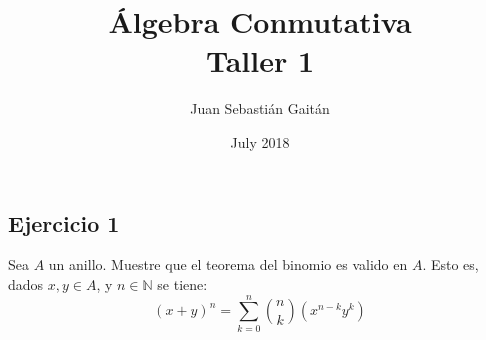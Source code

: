 \documentclass{article}
\title{ \'Algebra Conmutativa \\ Taller 1}
\author{Juan Sebasti\'an Gait\'an }
\date{July 2018}
\begin{document}
\maketitle
\subsection*{Ejercicio 1}
Sea $A$ un anillo. Muestre que el teorema del binomio es valido en $A$. Esto es, dados $x,y\in A$, y $n\in \mathbb{N}$ se tiene:
\begin{equation}
  (x+y)^n = \sum_{k=0}^{n}{\binom{n}{k}(x^{n-k}y^{k})}
\end{equation}
\end{document}
